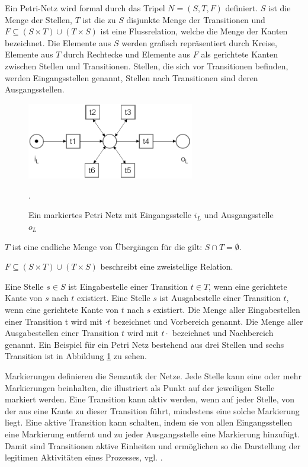 Ein Petri-Netz wird formal durch das Tripel $N = (S, T, F)$ definiert. $S$ ist die Menge der Stellen, $T$  ist  die  zu  $S$  disjunkte  Menge  der  Transitionen  und  $F⊆ (S ×  T) ∪ (T  ×  S) $ ist  eine Flussrelation,  welche  die  Menge  der  Kanten  bezeichnet.  Die  Elemente  aus  $S$  werden grafisch repräsentiert durch Kreise, Elemente aus $T$ durch Rechtecke und Elemente aus $F$ als gerichtete Kanten zwischen Stellen und Transitionen. Stellen,  die  sich  vor  Transitionen  befinden, werden Eingangsstellen genannt, Stellen nach Transitionen sind deren Ausgangsstellen. 

\begin{figure}[!h]
    \centering
    \includegraphics[width=0.65\textwidth]{figures/Appbildungen/petriNetFlower.png}
    \caption{Ein markiertes Petri Netz mit Eingangsstelle $i_L$ und Ausgangsstelle $o_L$}.
    \label{fig:exampleFlower}
\end{figure}

$T$ ist eine endliche Menge von Übergängen für die gilt: $S ∩ T =  ∅.$

$F ⊆(S × T) ∪ (T × S)$ beschreibt eine zweistellige Relation.

Eine  Stelle  $s∈S$  ist  Eingabestelle  einer  Transition  $t∈T$,  wenn  eine  gerichtete  Kante  von $s$ nach $t$ existiert. Eine Stelle $s$ ist Ausgabestelle einer Transition $ t$, wenn eine gerichtete Kante von $t$ nach $s$ existiert. Die Menge aller Eingabestellen einer Transition t wird mit $\cdot t$ bezeichnet und Vorbereich genannt. Die Menge aller Ausgabestellen einer Transition $t$ wird mit $t \cdot$ bezeichnet und Nachbereich genannt. Ein Beispiel für ein Petri Netz bestehend aus drei Stellen und sechs Transition ist in Abbildung \ref{fig:exampleFlower} zu sehen.

Markierungen definieren die Semantik der Netze. Jede Stelle kann eine oder mehr Markierungen beinhalten, die illustriert als Punkt auf der jeweiligen Stelle markiert werden. Eine Transition kann aktiv werden, wenn auf jeder Stelle, von der aus eine Kante zu dieser Transition führt, mindestens eine solche Markierung liegt. Eine aktive Transition kann schalten, indem sie von allen Eingangsstellen eine Markierung entfernt und zu jeder Ausgangsstelle eine Markierung hinzufügt. Damit sind Transitionen aktive Einheiten und ermöglichen so die Darstellung der legitimen Aktivitäten eines Prozesses, vgl. \cite{Petrinetze}.
\newpage
